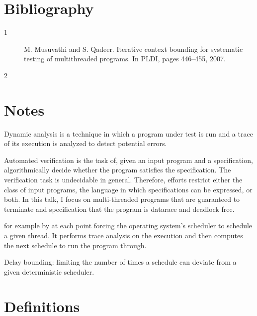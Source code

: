 \documentclass[]{article}
\begin{document}
\section*{Bibliography}
\begin{description}
\item[1]
M. Musuvathi and S. Qadeer.  
Iterative context bounding for systematic testing of multithreaded programs. 
In PLDI, pages 446–455, 2007.

\item[2]
\end{description}


\section*{Notes}
Dynamic analysis is a technique in which a program under test is run and a trace of its execution is analyzed to detect 
potential errors.

Automated verification is the task of, given an input program and a specification, algorithmically decide whether the 
program satisfies the specification.
The verification task is undecidable in general.
Therefore, efforts restrict either the class of input programs, the language in which specifications can be expressed, 
or both.
In this talk, I focus on multi-threaded programs that are guaranteed to terminate and specification that the program
is datarace and deadlock free.



for example by at each 
point forcing the operating system's scheduler to schedule a given thread.
It performs trace analysis on the execution and then computes the next schedule to run the program through.

Delay bounding: limiting the number of times a schedule can deviate from a given deterministic scheduler.




\section{Definitions}
\end{document}
